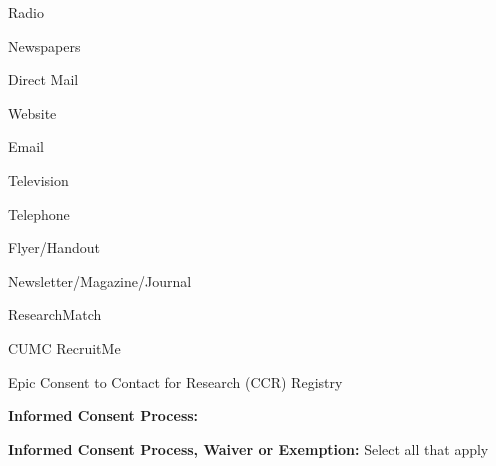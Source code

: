 \documentclass[10pt, letterpaper]{article}
\begin{document}
\noindent \makebox[0pt][l]{$\square$}\hspace{1.2em} Radio

\noindent \makebox[0pt][l]{$\square$}\hspace{1.2em} Newspapers

\noindent \makebox[0pt][l]{$\square$}\hspace{1.2em} Direct Mail

\noindent \makebox[0pt][l]{$\square$}\hspace{1.2em} Website

\noindent \makebox[0pt][l]{\color{columbiablue_official}$\boxtimes$}\hspace{1.2em} Email

\noindent \makebox[0pt][l]{$\square$}\hspace{1.2em} Television

\noindent \makebox[0pt][l]{\color{columbiablue_official}$\boxtimes$}\hspace{1.2em} Telephone

\noindent \makebox[0pt][l]{$\square$}\hspace{1.2em} Flyer/Handout

\noindent \makebox[0pt][l]{$\square$}\hspace{1.2em} Newsletter/Magazine/Journal

\noindent \makebox[0pt][l]{$\square$}\hspace{1.2em} ResearchMatch

\noindent \makebox[0pt][l]{$\square$}\hspace{1.2em} CUMC RecruitMe

\noindent \makebox[0pt][l]{$\square$}\hspace{1.2em} Epic Consent to Contact for Research (CCR) Registry

\vspace{0.5em}

\vspace{0.5em}

\noindent \textbf{Informed Consent Process:}

\vspace{0.5em}

\vspace{0.5em}

\noindent \textbf{Informed Consent Process, Waiver or Exemption:} Select all that apply

\vspace{0.5em}

\vspace{0.5em}
\end{document}
